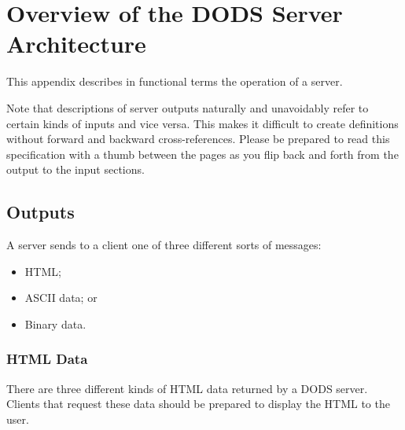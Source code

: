%
%
%
%
%
%

\chapter{Overview of the DODS Server Architecture}
\label{pguide,server}

This appendix describes in functional terms the operation of a server.

Note that descriptions of server outputs naturally and unavoidably
refer to certain kinds of inputs and vice versa.  This makes it
difficult to create definitions without forward and backward
cross-references.  Please be prepared to read this specification with
a  thumb between the pages as you flip back and
forth from the output to the input sections.

\section{Outputs}
\label{pguide,server,output}

A server sends to a client one of three different sorts of messages:

\begin{itemize}
\item HTML;
\item ASCII data; or
\item Binary data.
\end{itemize}

\subsection{HTML Data}

There are three different kinds of HTML data returned by a DODS server.
Clients that request these data should be prepared to display the HTML
to the user.

